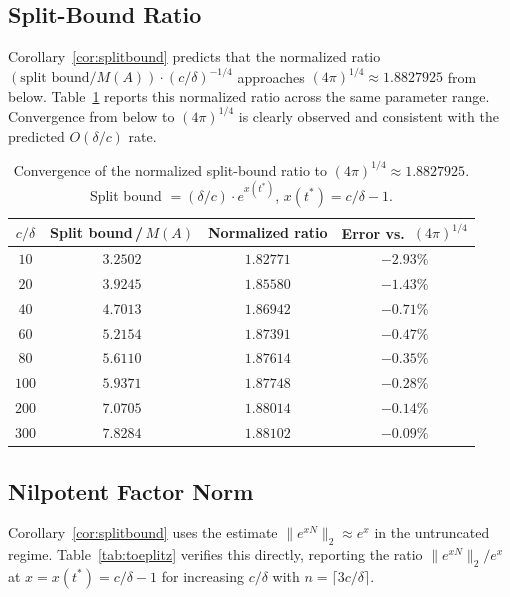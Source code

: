 \documentclass[11pt,reqno]{article}
\theoremstyle{plain}
\theoremstyle{definition}
\theoremstyle{remark}
\numberwithin{equation}{section}
\begin{document}
\subsection{Split-Bound Ratio}\label{subsec:split}

Corollary~\ref{cor:splitbound} predicts that the normalized ratio $(\text{split bound}/M(A))\cdot(c/\delta)^{-1/4}$ approaches $(4\pi)^{1/4} \approx 1.8827925$ from below. Table~\ref{tab:split} reports this normalized ratio across the same parameter range. Convergence from below to $(4\pi)^{1/4}$ is clearly observed and consistent with the predicted $O(\delta/c)$ rate.

\begin{table}[ht]
\centering
\caption{Convergence of the normalized split-bound ratio to $(4\pi)^{1/4} \approx 1.8827925$. Split bound $= (\delta/c)\cdot e^{x(t^*)}$, $x(t^*) = c/\delta - 1$.}
\label{tab:split}
\begin{tabular}{cccc}
\toprule
$c/\delta$ & Split bound\,/\,$M(A)$ & Normalized ratio & Error vs.\ $(4\pi)^{1/4}$ \\
\midrule
$10$  & $3.2502$  & $1.82771$ & $-2.93\%$ \\
$20$  & $3.9245$  & $1.85580$ & $-1.43\%$ \\
$40$  & $4.7013$  & $1.86942$ & $-0.71\%$ \\
$60$  & $5.2154$  & $1.87391$ & $-0.47\%$ \\
$80$  & $5.6110$  & $1.87614$ & $-0.35\%$ \\
$100$ & $5.9371$  & $1.87748$ & $-0.28\%$ \\
$200$ & $7.0705$  & $1.88014$ & $-0.14\%$ \\
$300$ & $7.8284$  & $1.88102$ & $-0.09\%$ \\
\bottomrule
\end{tabular}
\end{table}

\subsection{Nilpotent Factor Norm}\label{subsec:toeplitz}

Corollary~\ref{cor:splitbound} uses the estimate $\|e^{xN}\|_2 \approx e^x$ in the untruncated regime. Table~\ref{tab:toeplitz} verifies this directly, reporting the ratio $\|e^{xN}\|_2/e^x$ at $x = x(t^*) = c/\delta - 1$ for increasing $c/\delta$ with $n = \lceil 3c/\delta \rceil$.
\end{document}
